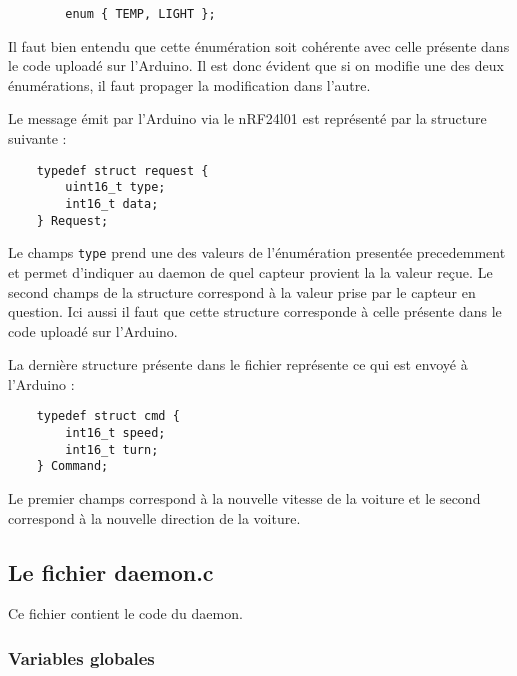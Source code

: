 \begin{DDbox}{\linewidth}
\begin{lstlisting}
        enum { TEMP, LIGHT };
\end{lstlisting}
\end{DDbox}

Il faut bien entendu que cette énumération soit cohérente avec celle présente
dans le code uploadé sur l'Arduino. Il est donc évident que si on modifie une
des deux énumérations, il faut propager la modification dans l'autre.

Le message émit par l'Arduino via le nRF24l01 est représenté par la structure
suivante : \\

\begin{DDbox}{\linewidth}
\begin{lstlisting}
	typedef struct request {
		uint16_t type;
		int16_t data;
	} Request;
\end{lstlisting}
\end{DDbox}

Le champs \texttt{type} prend une des valeurs de l'énumération presentée
precedemment et permet d'indiquer au daemon de quel capteur provient la
la valeur reçue. Le second champs de la structure correspond à la valeur
prise par le capteur en question. Ici aussi il faut que cette structure 
corresponde à celle présente dans le code uploadé sur l'Arduino.

La dernière structure présente dans le fichier représente ce qui est envoyé à
l'Arduino : \\

\begin{DDbox}{\linewidth}
\begin{lstlisting}
	typedef struct cmd {
		int16_t speed;
		int16_t turn;
	} Command;	
\end{lstlisting}
\end{DDbox}

Le premier champs correspond à la nouvelle vitesse de la voiture et le second
correspond à la nouvelle direction de la voiture.

\subsection{Le fichier daemon.c}

Ce fichier contient le code du daemon.

\pagebreak

\subsubsection{Variables globales}


